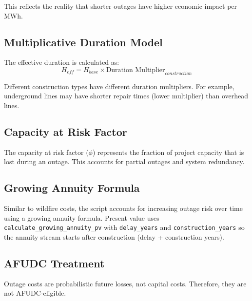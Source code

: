 \documentclass[ctcc_full_documentation.tex]{subfiles}
\begin{document}
This reflects the reality that shorter outages have higher economic impact per MWh.

\subsection{Multiplicative Duration Model}

The effective duration is calculated as:
\[
H_{eff} = H_{base} \times \text{Duration Multiplier}_{construction}
\]

Different construction types have different duration multipliers. For example, underground lines may have shorter repair times (lower multiplier) than overhead lines.

\subsection{Capacity at Risk Factor}

The capacity at risk factor ($\phi$) represents the fraction of project capacity that is lost during an outage. This accounts for partial outages and system redundancy.

\subsection{Growing Annuity Formula}

Similar to wildfire costs, the script accounts for increasing outage risk over time using a growing annuity formula. Present value uses \texttt{calculate\_growing\_annuity\_pv} with \texttt{delay\_years} and \texttt{construction\_years} so the annuity stream starts after construction (delay + construction years).

\subsection{AFUDC Treatment}

Outage costs are probabilistic future losses, not capital costs. Therefore, they are not AFUDC-eligible.
\end{document}
